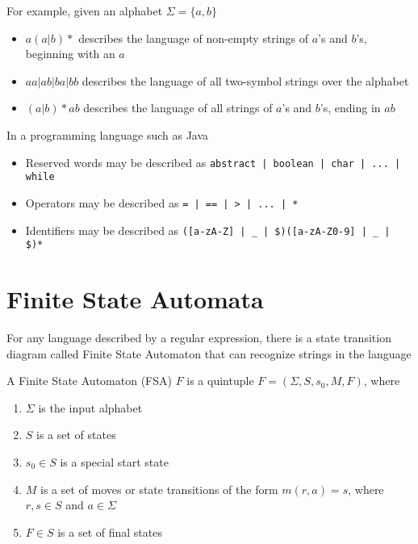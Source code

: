 \documentclass[8pt,a4paper,compress]{beamer}
\begin{document}
\begin{frame}[fragile]
\pause

For example, given an alphabet $\Sigma = \{a,b\}$

\begin{itemize}
\pause
\item $a(a|b)*$ describes the language of \pause non-empty strings of $a$'s and $b$'s, beginning with an $a$

\pause
\item $aa | ab | ba | bb$ describes the language of \pause all two-symbol strings over the alphabet

\pause
\item $(a|b)\!*\!ab$ describes the language of \pause all strings of $a$'s and $b$'s, ending in $ab$
\end{itemize}

\pause\bigskip

In a programming language such as Java
\begin{itemize}
\pause
\item Reserved words may be described as \lstinline{abstract | boolean | char | ... | while}

\pause
\item Operators may be described as \lstinline{= | == | > | ... | *}

\pause
\item Identifiers may be described as \lstinline{([a-zA-Z] | _ | $)([a-zA-Z0-9] | _ | $)*}
\end{itemize}
\end{frame}

\section{Finite State Automata}
\begin{frame}[fragile]
\pause

For any language described by a regular expression, there is a state transition diagram called Finite State Automaton that can recognize strings in the language

\pause\bigskip

A Finite State Automaton (FSA) $F$ is a quintuple $F = (\Sigma, S, s_0, M, F)$, where
\begin{enumerate}
\pause
\item $\Sigma$ is the input alphabet

\pause
\item $S$ is a set of states

\pause
\item $s_0 \in S$ is a special start state

\pause
\item $M$ is a set of moves or state transitions of the form $m(r, a) = s$, where $r,s \in S$ and $a \in \Sigma$

\pause
\item $F \in S$ is a set of final states
\end{enumerate}
\end{frame}
\end{document}
